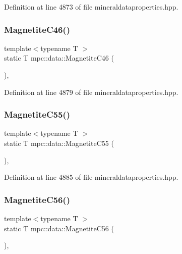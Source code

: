 Definition at line 4873 of file mineraldataproperties.\+hpp.

\mbox{\label{namespacempc_1_1data_af9814ae3c7605cf10580fb41f168684f}} 
\subsubsection{\texorpdfstring{Magnetite\+C46()}{MagnetiteC46()}}
{\footnotesize\ttfamily template$<$typename T $>$ \\
static T mpc\+::data\+::\+Magnetite\+C46 (\begin{DoxyParamCaption}{ }\end{DoxyParamCaption})\hspace{0.3cm}{\ttfamily [inline]}, {\ttfamily [static]}}



Definition at line 4879 of file mineraldataproperties.\+hpp.

\mbox{\label{namespacempc_1_1data_a60038ef81dda8620398a8150802725e1}} 
\subsubsection{\texorpdfstring{Magnetite\+C55()}{MagnetiteC55()}}
{\footnotesize\ttfamily template$<$typename T $>$ \\
static T mpc\+::data\+::\+Magnetite\+C55 (\begin{DoxyParamCaption}{ }\end{DoxyParamCaption})\hspace{0.3cm}{\ttfamily [inline]}, {\ttfamily [static]}}



Definition at line 4885 of file mineraldataproperties.\+hpp.

\mbox{\label{namespacempc_1_1data_ac64f6a178aa0f2028fa0e3fbe0867e2e}} 
\subsubsection{\texorpdfstring{Magnetite\+C56()}{MagnetiteC56()}}
{\footnotesize\ttfamily template$<$typename T $>$ \\
static T mpc\+::data\+::\+Magnetite\+C56 (\begin{DoxyParamCaption}{ }\end{DoxyParamCaption})\hspace{0.3cm}{\ttfamily [inline]}, {\ttfamily [static]}}



